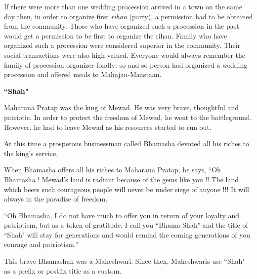 If there were more than one wedding procession arrived in a town on the same
day then, in order to organize first \textit{rihan} (party), a permission had
to be obtained from the community. Those who have organized such a procession
in the past would get a permission to be first to organize the rihan. Family
who have organized such a procession were considered superior in the community.
Their social transactions were also high-valued. Everyone would always remember
the family of procession organizer fondly: so and so person had organized a
wedding procession and offered meals to Mahajan-Maastaan.
\begin{framed}
\begin{center}\textbf{``Shah"}\end{center}

Maharana Pratap was the king of Mewad. He was very brave, thoughtful and
patriotic. In order to protect the freedom of Mewad, he went to the
battleground. However, he had to leave Mewad as his resources started to run
out. 

At this time a prosperous businessman called Bhamasha devoted all his riches to
the king's service.

When Bhamasha offers all his riches to Maharana Pratap, he says, ``Oh Bhamasha !
Mewad's land is radiant because of the gems like you !! The land which beers
such courageous people will never be under siege of anyone !!! It will always
in the paradise of freedom.

``Oh Bhamasha, I do not have much to offer you in return of your loyalty and
patriotism, but as a token of gratitude, I call you ``Bhama Shah" and the title
of ``Shah" will stay for generations and would remind the coming generations of
you courage and patriotism."

This brave Bhamashah was a Maheshwari. Since then, Maheshwaris use ``Shah" as a
prefix or postfix title as a custom.

\end{framed}
